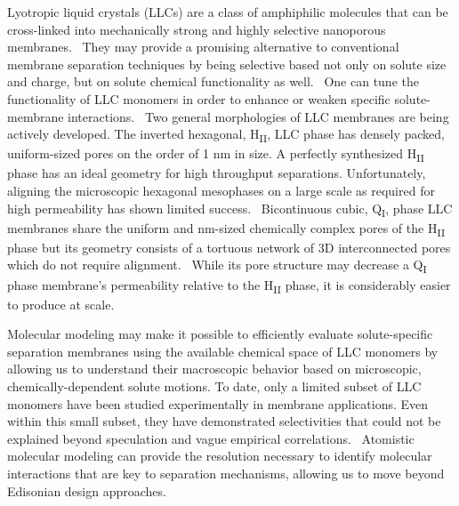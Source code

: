 \documentclass[journal=jctcce,manuscript=article]{achemso}
\begin{document}
  Lyotropic liquid crystals (LLCs) are a class of amphiphilic molecules that
  can be cross-linked into mechanically strong and highly selective nanoporous
  membranes.~\cite{gin_polymerized_2008} They may provide a promising
  alternative to conventional membrane separation techniques by being selective
  based not only on solute size and charge, but on solute chemical
  functionality as well.~\cite{dischinger_application_2017} One can tune the
  functionality of LLC monomers in order to enhance or weaken specific
  solute-membrane interactions.~\cite{dischinger_effect_2017} Two general
  morphologies of LLC membranes are being actively developed. The inverted
  hexagonal, H\textsubscript{II}, LLC phase has densely packed, uniform-sized
  pores on the order of 1 nm in size. A perfectly synthesized
  H\textsubscript{II} phase has an ideal geometry for high throughput
  separations. Unfortunately, aligning the microscopic hexagonal mesophases on
  a large scale as required for high permeability has shown limited
  success.~\cite{feng_scalable_2014,feng_thin_2016} Bicontinuous cubic,
  Q\textsubscript{I}, phase LLC membranes share the uniform and nm-sized chemically
  complex pores of the H\textsubscript{II} phase but its geometry consists of a
  tortuous network of 3D interconnected pores which do not require
  alignment.~\cite{carter_glycerol-based_2012} While its pore structure may
  decrease a Q\textsubscript{I} phase membrane's permeability relative to the
  H\textsubscript{II} phase, it is considerably easier to produce 
  at scale.~\cite{hatakeyama_nanoporous_2010}
  
  Molecular modeling may make it possible to efficiently evaluate
  solute-specific separation membranes using the available chemical space of
  LLC monomers
  by allowing us to understand their macroscopic behavior based on microscopic, chemically-dependent solute motions.
  To date, only a limited subset of LLC monomers have been
  studied experimentally in membrane applications.
  \cite{carter_glycerol-based_2012,hatakeyama_nanoporous_2010,smith_ordered_1997,zhou_assembly_2003,resel_structural_2000}
  Even within this small subset, they have demonstrated selectivities that
  could not be explained beyond speculation and vague empirical
  correlations.~\cite{dischinger_application_2017} Atomistic molecular modeling
  can provide the resolution necessary to identify molecular interactions that
  are key to separation mechanisms, allowing us to move beyond Edisonian design
  approaches.
\end{document}
